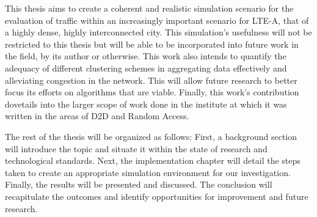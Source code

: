 This thesis aims to create a coherent and realistic simulation scenario for the evaluation of traffic within an increasingly important scenario for LTE-A, that of a highly dense, highly interconnected city. This simulation's usefulness will not be restricted to this thesis but will be able to be incorporated into future work in the field, by its author or otherwise. This work also intends to quantify the adequacy of different clustering schemes in aggregating data effectively and alleviating congestion in the network. This will allow future research to better focus its efforts on algorithms that are viable. Finally, this work's contribution dovetails into the larger scope of work done in the institute at which it was written in the areas of D2D and Random Access.

The rest of the thesis will be organized as follows: First, a background section will introduce the topic and situate it within the state of research and technological standards. Next, the implementation chapter will detail the steps taken to create an appropriate simulation environment for our investigation. Finally, the results will be presented and discussed. The conclusion will recapitulate the outcomes and identify opportunities for improvement and future research.
